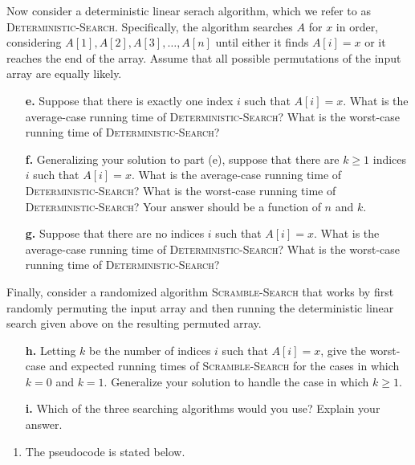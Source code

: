\begin{enumerate}
{Now consider a deterministic linear serach algorithm, which we refer to as
\textsc{Deterministic-Search}. Specifically, the algorithm searches $A$ for $x$
in order, considering $A[1], A[2], A[3], \dots, A[n]$ until either it finds
$A[i] = x$ or it reaches the end of the array. Assume that all possible
permutations of the input array are equally likely.

\begin{enumerate}
\item[\textbf{e.}] Suppose that there is exactly one index $i$ such that
$A[i] = x$. What is the average-case running time of
\textsc{Deterministic-Search}?  What is the worst-case running time of
\textsc{Deterministic-Search}?
\item[\textbf{f.}] Generalizing your solution to part (e), suppose that there
are $k \ge 1$ indices $i$ such that $A[i] = x$. What is the average-case running
time of \textsc{Deterministic-Search}? What is the worst-case running time of
\textsc{Deterministic-Search}? Your answer should be a function of $n$ and $k$.
\item[\textbf{g.}] Suppose that there are no indices $i$ such that $A[i] = x$.
What is the average-case running time of \textsc{Deterministic-Search}? What
is the worst-case running time of \textsc{Deterministic-Search}?
\end{enumerate}

Finally, consider a randomized algorithm \textsc{Scramble-Search} that works by
first randomly permuting the input array and then running the deterministic
linear search given above on the resulting permuted array.

\begin{enumerate}
\item[\textbf{h.}] Letting $k$ be the number of indices $i$ such that
$A[i] = x$, give the worst-case and expected running times of
\textsc{Scramble-Search} for the cases in which $k = 0$ and $k = 1$. Generalize
your solution to handle the case in which $k \ge 1$.
\item[\textbf{i.}] Which of the three searching algorithms would you use?
Explain your answer.
\end{enumerate}
}

\begin{framed}
\begin{enumerate}
\item The pseudocode is stated below.

\begin{algorithm}[H]
\SetAlgoNoEnd\DontPrintSemicolon
\BlankLine
{}
\end{algorithm}


\end{enumerate}
\end{framed}
\end{enumerate}
